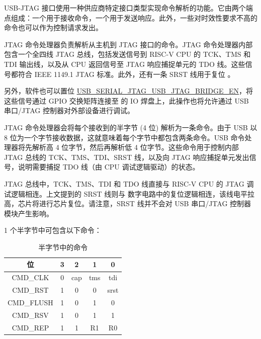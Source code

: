\documentclass[main\_\_CN.tex]{subfiles}
\begin{document}
USB-JTAG 接口使用一种供应商特定接口类型实现命令解析的功能。它由两个端点组成：一个用于接收命令，一个用于发送响应。此外，一些对时效性要求不高的命令也可以作为控制请求发出。

JTAG 命令处理器负责解析从主机到 JTAG 接口的命令。JTAG 命令处理器内部包含一个全四线 JTAG 总线，包括发送信号到 RISC-V CPU 的 TCK、TMS 和 TDI 输出线，以及从 CPU 返回信号至 JTAG 响应捕捉单元的 TDO 线。这些信号都符合 IEEE 1149.1 JTAG 标准。此外，还有一条 SRST 线用于复位 \chipname{}。

另外，软件也可以置位 \hyperref[fielddesc:USBSERIALJTAGUSBJTAGBRIDGEEN]{USB\_SERIAL\_JTAG\_USB\_JTAG\_BRIDGE\_EN}，将这些信号通过 GPIO 交换矩阵连接至 \chipname{} 的 IO 焊盘上，此操作也将允许通过 USB 串口/JTAG 控制器对外部设备进行调试。

JTAG 命令处理器会将每个接收到的半字节 (4 位) 解析为一条命令。由于 USB 以 8 位为一个字节接收数据，这就意味着每个字节中都包含两条命令。USB 命令处理器将先解析高 4 位字节，然后再解析低 4 位字节。这些命令用于控制内部 JTAG 总线的 TCK、TMS、TDI、SRST 线，以及向 JTAG 响应捕捉单元发出信号，说明需要捕捉 TDO 线（由 CPU 调试逻辑驱动）的状态。

JTAG 总线中，TCK、TMS、TDI 和 TDO 线直接与 RISC-V CPU 的 JTAG 调试逻辑相连。上文提到的 SRST 线则与 \chipname{} 数字电路中的复位逻辑相连，该线电平拉高，芯片将进行芯片复位。请注意，SRST 线并不会对 USB 串口/JTAG 控制器模块产生影响。

1 个半字节中可包含以下命令：

\begin{table}[H]
    \centering
    \caption{半字节中的命令}
    \label{tab:usbserialjtag-commands-of-a-nibble}
    
    \begin{tabular}{|c|c c c c|}
    \hline
        \rowcolor{lightgray}
        \textbf{位} & \textbf{3} & \textbf{2} & \textbf{1} & \textbf{0}
        \\\hline
        
        CMD\_CLK & 0 &  cap & tms & tdi \\\hline
        CMD\_RST & 1 & 0 & 0 & srst \\\hline
        CMD\_FLUSH & 1 & 0 & 1 & 0 \\\hline
        CMD\_RSV & 1 & 0 & 1 & 1 \\\hline
        CMD\_REP & 1 & 1 & R1 & R0 \\\hline
    \end{tabular}
\end{table}
\end{document}
